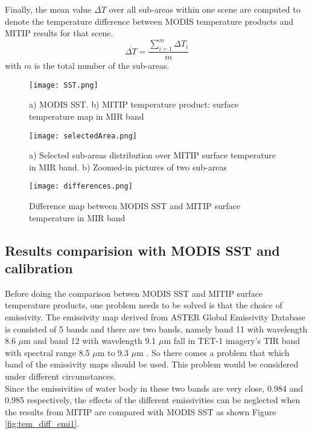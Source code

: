 \noindent Finally, the mean value $\overline{\Delta T}$ over all sub-areas within one scene are computed to denote the temperature difference between MODIS temperature products and MITIP results for that scene.\\
\begin{equation}
\label{eq1}
\overline{\Delta T} =\frac{\sum_{i=1}^m \Delta T_i}{m}
\end{equation}
with $m$ is the total number of the sub-areas.

\begin{figure}[!htbp]
\centering\texttt{[image: SST.png]}
\caption{a) MODIS SST. b) MITIP temperature product: surface temperature map in MIR band}
\label{fig:SST}

\centering\texttt{[image: selectedArea.png]}
\caption{a) Selected sub-areas distribution over MITIP surface temperature in MIR band. b) Zoomed-in pictures of two sub-areas}
\label{fig:selectedArea}
\end{figure}

\begin{figure}[!htbp]
\centering\texttt{[image: differences.png]}
\caption{Difference map between MODIS SST and MITIP surface temperature in MIR band}
\label{fig:Diff}
\end{figure}


\subsection{Results comparision with MODIS SST and calibration}
Before doing the comparison betwen MODIS SST and MITIP surface temperature products, one problem needs to be solved is that the choice of emissivity. The emissivity map derived from ASTER Global Emissivity Database is consisted of 5 bands and there are two bands, namely band 11 with wavelength 8.6 $\mu$m and band 12 with wavelength 9.1 $\mu$m fall in TET-1 imagery's TIR band with spectral range 8.5 $\mu$m to 9.3 $\mu$m \parencite{Reference306}. So there comes a problem that which band of the emissivity maps should be used. This problem would be considered under different circumstances.\\

\noindent Since the emissivities of water body in these two bands are very close, 0.984  and 0.985 respectively, the effects of the different emissivities can be neglected when the results from MITIP are compared with MODIS SST as shown Figure \ref{fig:tem_diff_emi1}.\\

